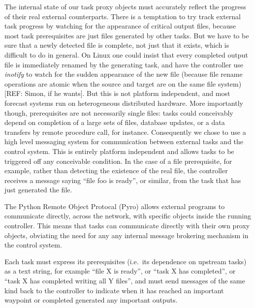 \documentclass[11pt,a4paper]{article}
\begin{document}
The internal state of our task proxy objects must accurately reflect the
progress of their real external counterparts.  There is a temptation to
try track external task progress by watching for the appearance of
critical output files, because most task prerequisites are just files
generated by other tasks. But we have to be sure that a newly detected
file is complete, not just that it exists, which is difficult to do in
general.  On Linux one could insist that every completed output file is
immediately renamed by the generating task, and have the controller use
{\em inotify} to watch for the sudden appearance of the new file
(because file rename operations are atomic when the source and target
are on the same file system) [REF: Simon, if he wants]. But this is not
platform independent, and most forecast systems run on heterogeneous
distributed hardware. More importantly though, prerequisites are not
necessarily single files: tasks could conceivably depend on completion
of a large sets of files, database updates, or a data transfers by
remote procedure call, for instance. Consequently we chose to use a high
level messaging system for communication between external tasks and the
control system. This is entirely platform independent and allows tasks
to be triggered off any conceivable condition. In the case of a file
prerequisite, for example, rather than detecting the existence of the
real file, the controller receives a message saying ``file foo is
ready'', or similar, from the task that has just generated the file.

The Python Remote Object Protocal (Pyro) allows external programs to
communicate directly, across the network, with specific objects inside
the running controller. This means that tasks can communicate directly
with their own proxy objects, obviating the need for any any internal
message brokering mechanism in the control system.    

Each task must express its prerequisites (i.e.\ its dependence on
upstream tasks) as a text string, for example ``file X is ready'', or
``task X has completed'', or ``task X has completed writing all Y
files'', and must send messages of the same kind back to the controller
to indicate when it has reached an important waypoint or completed
generated any important outputs.  
\end{document}
